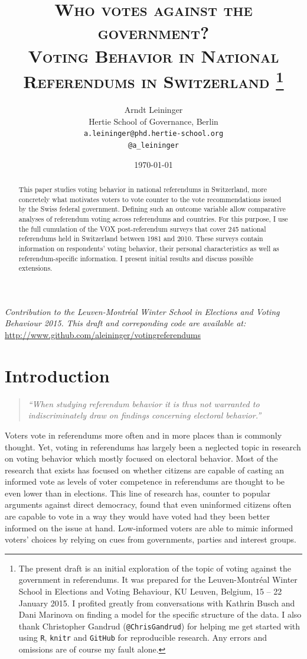 \documentclass[11pt,a4paper]{article}\usepackage[]{graphicx}\usepackage[]{color}
\author{Arndt Leininger \\ Hertie School of Governance, Berlin \\ \texttt{a.leininger@phd.hertie-school.org} \\ \large \texttt{@a\_leininger}}
\title{{\textsc{Who votes against the government?}}\\ \large{\textsc{Voting Behavior in National Referendums in Switzerland}}
\footnote{The present draft is an initial exploration of the topic of voting against the government in referendums. It was prepared for the Leuven-Montréal Winter School in Elections and Voting Behaviour, KU Leuven, Belgium, 15 -- 22 January 2015. I profited greatly from conversations with Kathrin Busch and Dani Marinova on finding a model for the specific structure of the data. I also thank Christopher Gandrud (\texttt{@ChrisGandrud}) for helping me get started with using \texttt{R}, \texttt{knitr} and \texttt{GitHub} for reproducible research. Any errors and omissions are of course my fault alone.}}
\date{\today}
\begin{document}
\maketitle

{\noindent \small \textit{Contribution to the Leuven-Montréal Winter School in Elections and Voting Behaviour 2015. This draft and correponding code are available at:}\\ \url{http://www.github.com/aleininger/votingreferendums}}



\begin{abstract}
  
\noindent This paper studies voting behavior in national referendums in Switzerland, more concretely what motivates voters to vote counter to the vote recommendations issued by the Swiss federal government. Defining such an outcome variable allow comparative analyses of referendum voting across referendums and countries.  For this purpose, I use the full cumulation of the VOX post-referendum surveys that cover 245 national referendums held in Switzerland between 1981 and 2010. These surveys contain information on respondents’ voting behavior, their personal characteristics as well as referendum-specific information. I present initial results and discuss possible extensions.
\end{abstract}	

\vfill

\newpage

\section{Introduction}\label{sec:introduction}

	\begin{quote}
		\textit{``When studying referendum behavior it is thus not warranted to
		indiscriminately draw on findings concerning electoral behavior.''} \citep[514]{schoen_wahlen_2012}
	\end{quote}

    Voters vote in referendums more often and in more places than is commonly thought. Yet, voting in referendums has largely been a neglected topic in research on voting behavior which mostly focused on electoral behavior. Most of the research that exists has focused on whether citizens are capable of casting an informed vote as levels of voter competence in referendums are thought to be even lower than in elections. This line of research has, counter to popular arguments against direct democracy, found that even uninformed citizens often are capable to vote in a way they would have voted had they been better informed on the issue at hand. Low-informed  voters are able to mimic informed voters' choices by relying on cues from governments, parties and interest groups.
    
\end{document}
